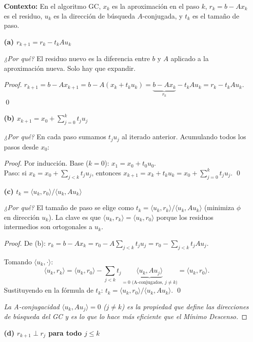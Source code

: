 \documentclass[11pt,a4paper]{article}
\begin{document}
\textbf{Contexto:} En el algoritmo GC, $x_k$ es la aproximación en el paso $k$, $r_k=b-Ax_k$ es el residuo, $u_k$ es la dirección de búsqueda $A$-conjugada, y $t_k$ es el tamaño de paso.

\medskip
\textbf{(a) $r_{k+1}=r_k-t_kAu_k$}

\textit{¿Por qué?} El residuo nuevo es la diferencia entre $b$ y $A$ aplicado a la aproximación nueva. Solo hay que expandir.

\begin{proof}
$r_{k+1}=b-Ax_{k+1}=b-A(x_k+t_ku_k)=\underbrace{b-Ax_k}_{r_k}-t_kAu_k=r_k-t_kAu_k$. \qed
\end{proof}

\medskip
\textbf{(b) $x_{k+1}=x_0+\sum_{j=0}^k t_ju_j$}

\textit{¿Por qué?} En cada paso sumamos $t_ju_j$ al iterado anterior. Acumulando todos los pasos desde $x_0$:

\begin{proof}
Por inducción. Base ($k=0$): $x_1=x_0+t_0u_0$. \checkmark \\
Paso: si $x_k=x_0+\sum_{j<k}t_ju_j$, entonces $x_{k+1}=x_k+t_ku_k=x_0+\sum_{j=0}^kt_ju_j$. \qed
\end{proof}

\medskip
\textbf{(c) $t_k=\langle u_k,r_0\rangle/\langle u_k,Au_k\rangle$}

\textit{¿Por qué?} El tamaño de paso se elige como $t_k=\langle u_k,r_k\rangle/\langle u_k,Au_k\rangle$ (minimiza $\phi$ en dirección $u_k$). La clave es que $\langle u_k,r_k\rangle=\langle u_k,r_0\rangle$ porque los residuos intermedios son ortogonales a $u_k$.

\begin{proof}
De (b): $r_k=b-Ax_k=r_0-A\sum_{j<k}t_ju_j=r_0-\sum_{j<k}t_jAu_j$.

Tomando $\langle u_k,\cdot\rangle$:
\[
  \langle u_k,r_k\rangle
  = \langle u_k,r_0\rangle - \sum_{j<k}t_j\underbrace{\langle u_k,Au_j\rangle}_{=0\text{ (A-conjugados, }j\ne k)}
  = \langle u_k,r_0\rangle.
\]
Sustituyendo en la fórmula de $t_k$: $t_k = \langle u_k,r_0\rangle/\langle u_k,Au_k\rangle$. \qed

\textit{La A-conjugacidad $\langle u_k,Au_j\rangle=0$ ($j\ne k$) es la propiedad que define las direcciones de búsqueda del GC y es lo que lo hace más eficiente que el Mínimo Descenso.}
\end{proof}

\medskip
\textbf{(d) $r_{k+1}\perp r_j$ para todo $j\le k$}
\end{document}
